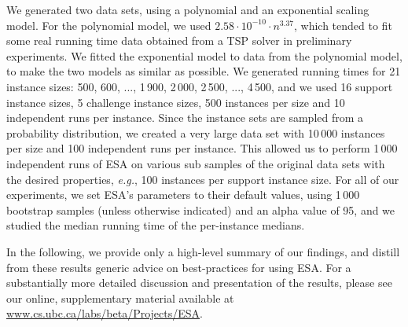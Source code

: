 \documentclass[aic]{iosart2x}
\newcommand{\eg}{\emph{e.g.}}
\begin{document}
We generated two data sets, using a polynomial and an exponential scaling model. For the polynomial model, we used $2.58\cdot 10^{-10} \cdot n^{3.37}$, which tended to fit some real running time data obtained from a TSP solver in preliminary experiments. 
We fitted the exponential model to data from the polynomial model, to make the two models as similar as possible. 
We generated running times for 21 instance sizes: 500, 600, ..., 1\,900, 2\,000, 2\,500, ..., 4\,500, and we used 16 support instance sizes, 5 challenge instance sizes, 500 instances per size and 10 independent runs per instance. 
Since the instance sets are sampled from a probability distribution, we created a very large data set with 10\,000 instances per size and 100 independent runs per instance. 
This allowed us to perform 1\,000 independent runs of ESA on various sub samples of the original data sets with the desired properties, \eg{}, 100 instances per support instance size.
For all of our experiments, we set ESA's parameters to their default values, using 1\,000 bootstrap samples (unless otherwise indicated) and an alpha value of 95, and we studied the median running time of the per-instance medians. 

In the following, we provide only a high-level summary of our findings, and distill from these results generic advice on best-practices for using ESA. 
For a substantially more detailed discussion and presentation of the results, please see our online, supplementary material available at \url{www.cs.ubc.ca/labs/beta/Projects/ESA}.

\end{document}
